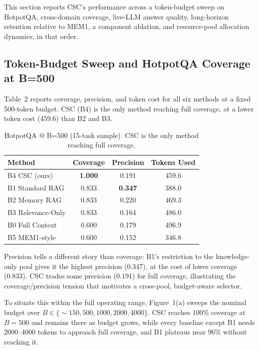 \documentclass{article}
\begin{document}
This section reports CSC's performance across a token-budget sweep on HotpotQA, cross-domain coverage, live-LLM answer quality, long-horizon retention relative to MEM1, a component ablation, and resource-pool allocation dynamics, in that order.

\subsection{Token-Budget Sweep and HotpotQA Coverage at B=500}

Table~2 reports coverage, precision, and token cost for all six methods at a fixed 500-token budget. CSC (B4) is the only method reaching full coverage, at a lower token cost (459.6) than B2 and B3.

\begin{table}[t]
\caption{HotpotQA @ B=500 (15-task sample). CSC is the only method reaching full coverage.}
\centering
\begin{tabular}{lccc}
\toprule
Method & Coverage & Precision & Tokens Used \\
\midrule
B4 CSC (ours) & \textbf{1.000} & 0.191 & 459.6 \\
B1 Standard RAG & 0.833 & \textbf{0.347} & 388.0 \\
B2 Memory RAG & 0.833 & 0.220 & 469.3 \\
B3 Relevance-Only & 0.833 & 0.164 & 486.0 \\
B0 Full Context & 0.600 & 0.179 & 496.9 \\
B5 MEM1-style & 0.600 & 0.152 & 346.8 \\
\bottomrule
\end{tabular}
\end{table}

Precision tells a different story than coverage: B1's restriction to the knowledge-only pool gives it the highest precision (0.347), at the cost of lower coverage (0.833). CSC trades some precision (0.191) for full coverage, illustrating the coverage/precision tension that motivates a cross-pool, budget-aware selector.

To situate this within the full operating range, Figure~1(a) sweeps the nominal budget over $B \in \{\sim\!150, 500, 1000, 2000, 4000\}$. CSC reaches 100\% coverage at $B=500$ and remains there as budget grows, while every baseline except B1 needs 2000--4000 tokens to approach full coverage, and B1 plateaus near 96\% without reaching it.
\end{document}
